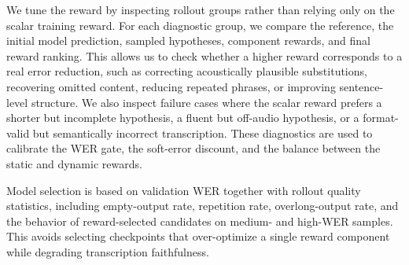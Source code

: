 \documentclass{llmxive}
\begin{document}
We tune the reward by inspecting rollout groups rather than relying only on the
scalar training reward. For each diagnostic group, we compare the reference, the
initial model prediction, sampled hypotheses, component rewards, and final reward
ranking. This allows us to check whether a higher reward corresponds to a real
error reduction, such as correcting acoustically plausible substitutions,
recovering omitted content, reducing repeated phrases, or improving sentence-level
structure. We also inspect failure cases where the scalar reward prefers a
shorter but incomplete hypothesis, a fluent but off-audio hypothesis, or a
format-valid but semantically incorrect transcription. These diagnostics are used
to calibrate the WER gate, the soft-error discount, and the balance between the
static and dynamic rewards.

Model selection is based on validation WER together with rollout quality
statistics, including empty-output rate, repetition rate, overlong-output rate,
and the behavior of reward-selected candidates on medium- and high-WER samples.
This avoids selecting checkpoints that over-optimize a single reward component
while degrading transcription faithfulness.


\end{document}
